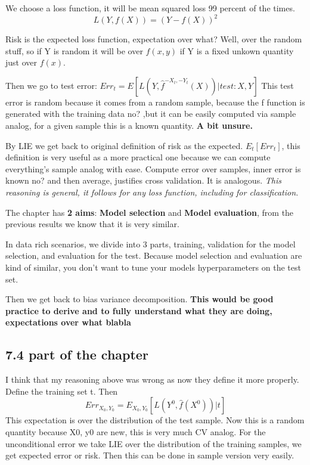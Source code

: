 \documentclass{article}
\begin{document}
We choose a loss function, it will be mean squared loss 99 percent of the times. $$L(Y,f(X))=(Y-f(X))^2$$ 

Risk is the expected loss function, expectation over what? Well, over the random stuff, so if Y is random it will be over $f(x,y)$ if Y is a fixed unkown quantity just over $f(x)$.

Then we go to test error: $Err_t= E[L(Y,\hat{f}^{-X_t,-Y_t}(X))|test: X,Y]$
This test error is random because it comes from a random sample, because the f function is generated with the training data no? ,but it can be easily computed via sample analog, for a given sample this is a known quantity. \textbf{A bit unsure.}

By LIE we get back to original definition of risk as the expected. $E_t[Err_t]$, this definition is very useful as a more practical one because we can compute everything's sample analog with ease. Compute error over samples, inner error is known no? and then average, justifies cross validation. It is analogous.
\textit{This reasoning is general, it follows for any loss function, including for classification.}

The chapter has \textbf{2 aims}: \textbf{Model selection} and \textbf{Model evaluation}, from the previous results we know that it is very similar.

In data rich scenarios, we divide into 3 parts, training, validation for the model selection, and evaluation for the test. Because model selection and evaluation are kind of similar, you don't want to tune your models hyperparameters on the test set.

Then we get back to bias variance decomposition. 
\textbf{This would be good practice to derive and to fully understand what they are doing, expectations over what blabla}

\subsection*{7.4 part of the chapter}

I think that my reasoning above was wrong as now they define it more properly.
Define the training set t.
Then $$Err_{X_0,Y_0}= E_{X_0,Y_0}[L(Y^0,\hat{f}(X^0))|t]$$
This expectation is over the distribution of the test sample. Now this is a random quantity because X0, y0 are new, this is very much CV analog.
For the unconditional error we take LIE over the distribution of the training samples, we get expected error or risk. Then this can be done in sample version very easily.
\end{document}
